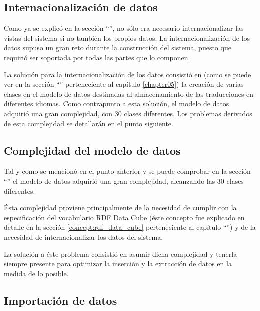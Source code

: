 	\subsection{Internacionalización de datos}
	\label{implementacion:internacionalizacion_datos}
		
		Como ya se explicó en la sección ``'', no sólo era necesario internacionalizar las vistas del sistema si no también los propios datos.  La internacionalización de los datos supuso un gran reto durante la construcción del sistema, puesto que requirió ser soportada por todas las partes que lo componen.
		
		La solución para la internacionalización de los datos consistió en (como se puede ver en la sección ``'' perteneciente al capítulo \ref{chapter05}) la creación de varias clases en el modelo de datos destinadas al almacenamiento de las traducciones en diferentes idiomas.  Como contrapunto a esta solución, el modelo de datos adquirió una gran complejidad, con 30 clases diferentes.  Los problemas derivados de esta complejidad se detallarán en el punto siguiente.
	
	\subsection{Complejidad del modelo de datos}
	\label{implementacion:internacionalizacion_datos}
		
		Tal y como se mencionó en el punto anterior y se puede comprobar en la sección ``'' el modelo de datos adquirió una gran complejidad, alcanzando las 30 clases diferentes.
		
		Ésta complejidad proviene principalmente de la necesidad de cumplir con la especificación del vocabulario RDF Data Cube (éste concepto fue explicado en detalle en la sección \ref{concept:rdf_data_cube} perteneciente al capítulo ``'') y de la necesidad de internacionalizar los datos del sistema.
		
		La solución a éste problema consistió en asumir dicha complejidad y tenerla siempre presente para optimizar la inserción y la extracción de datos en la medida de lo posible.
		
	\subsection{Importación de datos}
	\label{implementacion:importacion de datos}
		
